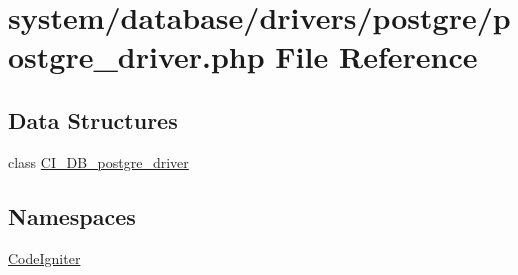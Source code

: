 \hypertarget{postgre__driver_8php}{\section{system/database/drivers/postgre/postgre\-\_\-driver.php File Reference}
\label{postgre__driver_8php}
}
\subsection*{Data Structures}
\begin{DoxyCompactItemize}
\item 
class \hyperlink{class_c_i___d_b__postgre__driver}{C\-I\-\_\-\-D\-B\-\_\-postgre\-\_\-driver}
\end{DoxyCompactItemize}
\subsection*{Namespaces}
\begin{DoxyCompactItemize}
\item 
\hyperlink{namespace_code_igniter}{Code\-Igniter}
\end{DoxyCompactItemize}

